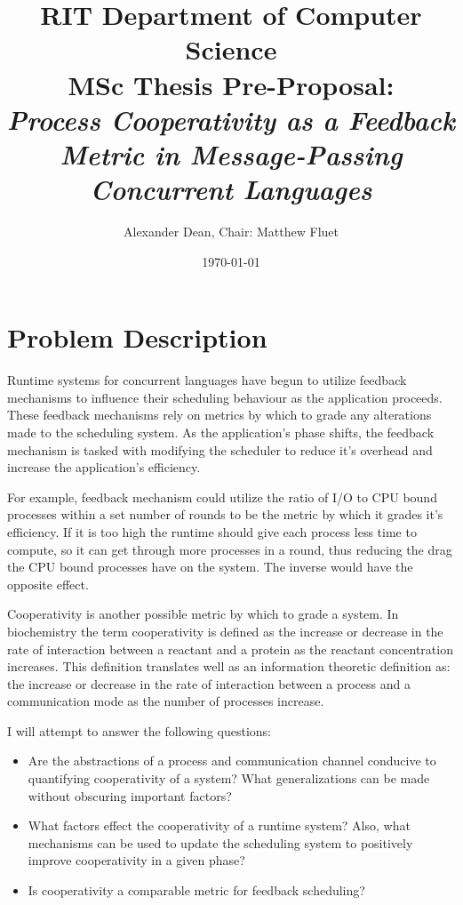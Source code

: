 \documentclass[11pt]{artikel3}
\title{RIT Department of Computer Science\\MSc Thesis Pre-Proposal:\\
	\emph{Process Cooperativity as a Feedback Metric in Message-Passing Concurrent Languages}
}
\author{Alexander Dean, Chair: Matthew Fluet}
\date{\today}
\begin{document}
\maketitle

\section{Problem Description}

Runtime systems for concurrent languages have begun to utilize feedback mechanisms to influence their
scheduling behaviour as the application proceeds. These feedback mechanisms rely on metrics by which to
grade any alterations made to the scheduling system. As the application's phase shifts, the feedback mechanism
is tasked with modifying the scheduler to reduce it's overhead and increase the application's efficiency.

For example, feedback mechanism could utilize the ratio of I/O to CPU bound processes within a set number
of rounds to be the metric by which it grades it's efficiency. If it is too high the runtime should give
each process less time to compute, so it can get through more processes in a round, thus reducing the drag
the CPU bound processes have on the system. The inverse would have the opposite effect.

Cooperativity is another possible metric by which to grade a system. In biochemistry the term cooperativity
is defined as the increase or decrease in the rate of interaction between a reactant and a protein as
the reactant concentration increases. This definition translates well as an information theoretic definition
as: the increase or decrease in the rate of interaction between a process and a communication mode as the
number of processes increase.


I will attempt to answer the following questions:
\begin{itemize}[leftmargin=.5in]
	\item Are the abstractions of a process and communication channel conducive to quantifying
		  cooperativity of a system? What generalizations can be made without obscuring important
		  factors?
	\item What factors effect the cooperativity of a runtime system? Also, what mechanisms can be used
		  to update the scheduling system to positively improve cooperativity in a given phase?
	\item Is cooperativity a comparable metric for feedback scheduling?
\end{itemize}
\end{document}
